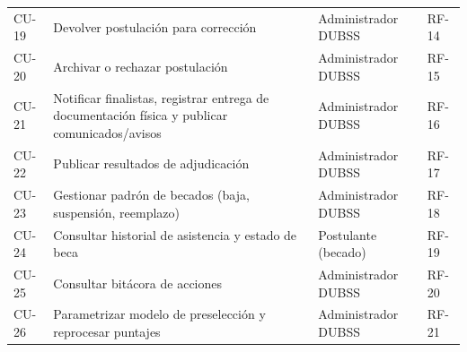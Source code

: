 \begin{longtable}{>{\raggedright\arraybackslash}p{1.4cm} >{\raggedright\arraybackslash}p{6.4cm} >{\raggedright\arraybackslash}p{3.2cm} >{\raggedright\arraybackslash}p{1.5cm}}
CU-19 & Devolver postulación para corrección & Administrador DUBSS & RF-14 \\
CU-20 & Archivar o rechazar postulación & Administrador DUBSS & RF-15 \\
CU-21 & Notificar finalistas, registrar entrega de documentación física y publicar comunicados/avisos & Administrador DUBSS & RF-16 \\
CU-22 & Publicar resultados de adjudicación & Administrador DUBSS & RF-17 \\
CU-23 & Gestionar padrón de becados (baja, suspensión, reemplazo) & Administrador DUBSS & RF-18 \\
CU-24 & Consultar historial de asistencia y estado de beca & Postulante (becado) & RF-19 \\
CU-25 & Consultar bitácora de acciones & Administrador DUBSS & RF-20 \\
CU-26 & Parametrizar modelo de preselección y reprocesar puntajes & Administrador DUBSS & RF-21 \\
\end{longtable}
\addtocounter{table}{-1}
